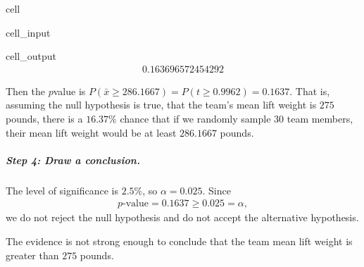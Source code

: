 \documentclass[letterpaper,10pt,english]{jupyterBook}
\begin{document}
\begin{sphinxuseclass}{cell}\begin{sphinxVerbatimInput}

\begin{sphinxuseclass}{cell_input}
\begin{sphinxVerbatim}[commandchars=\\\{\}]
\end{sphinxVerbatim}

\end{sphinxuseclass}\end{sphinxVerbatimInput}
\begin{sphinxVerbatimOutput}

\begin{sphinxuseclass}{cell_output}\begin{equation*}
\begin{split}0.163696572454292\end{split}
\end{equation*}
\end{sphinxuseclass}\end{sphinxVerbatimOutput}

\end{sphinxuseclass}
\sphinxAtStartPar
Then the \(p\)\sphinxhyphen{}value is \(P(\bar{x} \geq 286.1667) = P(t \geq 0.9962) = 0.1637\). That is, assuming the null hypothesis is true, that the team’s mean lift weight is \(275\) pounds, there is a \(16.37\%\) chance that if we randomly sample \(30\) team members, their mean lift weight would be at least \(286.1667\) pounds.


\subparagraph{Step 4: Draw a conclusion.}
\label{\detokenize{Ch6 An Introduction to Hypothesis Testing/6.4 Hypothesis Tests of One Population:id8}}
\sphinxAtStartPar
The level of significance is \(2.5\%\), so \(\alpha = 0.025\). Since
\begin{equation*}
\begin{split} p\text{-value} = 0.1637 \geq 0.025 = \alpha, \end{split}
\end{equation*}
\sphinxAtStartPar
we do not reject the null hypothesis and do not accept the alternative hypothesis.

\sphinxAtStartPar
The evidence is not strong enough to conclude that the team mean lift weight is greater than \(275\) pounds.
\end{document}

